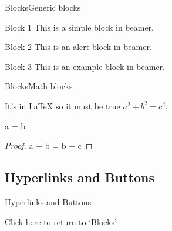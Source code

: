 \documentclass{beamer}
\begin{document}
    \label{Blocks}
    \begin{frame}{Blocks}{Generic blocks}

    \begin{block}{Block 1}
    This is a simple block in beamer.
    \end{block}

    \begin{alertblock}{Block 2}
    This is an alert block in beamer.
    \end{alertblock}

    \begin{exampleblock}{Block 3}
    This is an example block in beamer.
    \end{exampleblock}

    \end{frame}


    \begin{frame}{Blocks}{Math blocks}

    \begin{theorem}
        It's in \LaTeX{} so it must be true $ a^2 + b^2 = c^2$.
    \end{theorem}
    \begin{corollary}
        a = b
    \end{corollary}
    \begin{proof}
        a + b = b + c
    \end{proof}
    \end{frame}
    \subsection{Hyperlinks and Buttons}
    \begin{frame}{Hyperlinks and Buttons}

        \hyperlink{Blocks}{Click here to return to `Blocks'}

        \hyperlink{Outline}{}
    \end{frame}
\end{document}
